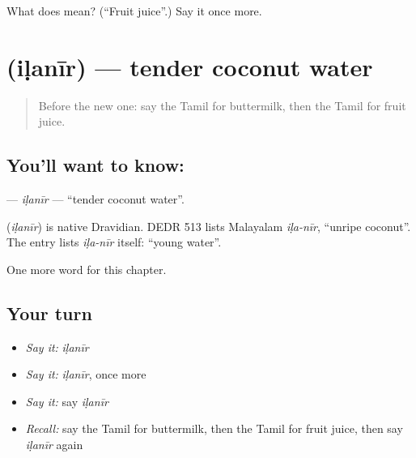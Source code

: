 \begin{tcolorbox}[breakable,colback=teal!4,colframe=teal!35!black,title={Before you move on}]
What does  mean? (\textquotedblleft{}Fruit juice\textquotedblright{}.) Say it once more.
\end{tcolorbox}
\section[\texorpdfstring{\ta{இளநீர்} (iḷanīr)}{இளநீர் (iḷanīr)}]{ (iḷanīr) — tender coconut water}

\label{lesson:TA-C214-ilanir}



\begin{quote}
Before the new one: say the Tamil for buttermilk, then the Tamil for fruit juice.
\end{quote}

\subsection*{You'll want to know: }
\textbf{} — \emph{iḷanīr} — \textquotedblleft{}tender coconut water\textquotedblright{}.

\begin{cousinweb}
\textbf{} (\emph{iḷanīr}) is native Dravidian. DEDR 513 lists Malayalam \emph{iḷa-nīr}, \textquotedblleft{}unripe coconut\textquotedblright{}. The entry lists \emph{iḷa-nīr} itself: \textquotedblleft{}young water\textquotedblright{}.
\end{cousinweb}

\begin{grammarlens}[title={What you've built}]
One more word for this chapter.
\end{grammarlens}

\subsection*{Your turn}
\begin{itemize}
\raggedright
  \item \emph{Say it:} \emph{iḷanīr}
  \item \emph{Say it:} \emph{iḷanīr}, once more
  \item \emph{Say it:} say \emph{iḷanīr}
  \item \emph{Recall:} say the Tamil for buttermilk, then the Tamil for fruit juice, then say \emph{iḷanīr} again
\end{itemize}


